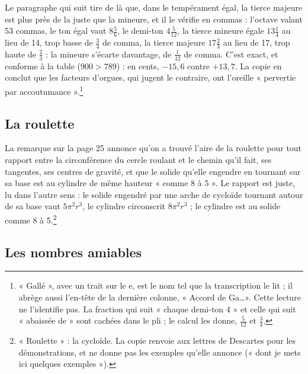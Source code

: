 \documentclass[11pt,a4paper]{article}
\begin{document}
Le paragraphe qui suit tire de là que, dans le tempérament égal, la tierce
majeure est plus près de la juste que la mineure, et il le vérifie en commas :
l'octave valant 53 commas, le ton égal vaut $8\frac56$, le demi-ton
$4\frac{5}{12}$, la tierce mineure égale $13\frac14$ au lieu de 14, trop basse
de $\frac34$ de comma, la tierce majeure $17\frac23$ au lieu de 17, trop haute de
$\frac23$ : la mineure s'écarte davantage, de $\frac{1}{12}$ de comma. C'est
exact, et conforme à la table ($900 > 789$) : en cents, $-15{,}6$ contre
$+13{,}7$. La copie en conclut que les facteurs d'orgues, qui jugent le
contraire, ont l'oreille « pervertie par accoutumance ».\footnote{« Gallé »,
avec un trait sur le e, est le nom tel que la transcription le lit ; il abrège
aussi l'en-tête de la dernière colonne, « Accord de Ga\dots ». Cette lecture ne
l'identifie pas. La fraction qui suit « chaque demi-ton 4 » et celle qui suit
« abaissée de » sont cachées dans le pli ; le calcul les donne, $\frac{5}{12}$ et
$\frac34$.}

\subsection*{La roulette}

La remarque sur la page 25 annonce qu'on a trouvé l'aire de la roulette pour
tout rapport entre la circonférence du cercle roulant et le chemin qu'il fait,
ses tangentes, ses centres de gravité, et que le solide qu'elle engendre en
tournant sur sa base est au cylindre de même hauteur « comme 8 à 5 ». Le
rapport est juste, lu dans l'autre sens : le solide engendré par une arche de
cycloïde tournant autour de sa base vaut $5\pi^2 r^3$, le cylindre circonscrit
$8\pi^2 r^3$ ; le cylindre est au solide comme 8 à 5.\footnote{« Roulette » :
la cycloïde. La copie renvoie aux lettres de Descartes pour les démonstrations,
et ne donne pas les exemples qu'elle annonce (« dont je mets ici quelques
exemples »).}

\subsection*{Les nombres amiables}
\end{document}
